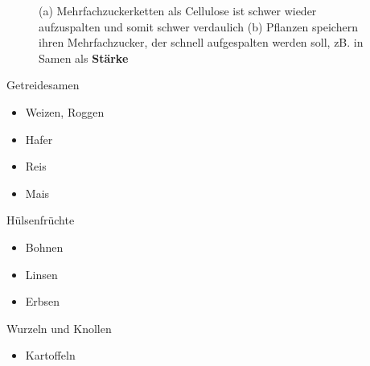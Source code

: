 \documentclass[xcolor=dvipsnames]{beamer}
\begin{document}
\begin{frame}[allowframebreaks]
        \begin{figure}
            \centering
            \caption{(a) Mehrfachzuckerketten als Cellulose ist schwer wieder aufzuspalten und somit schwer verdaulich
                     (b) Pflanzen speichern ihren Mehrfachzucker, der schnell aufgespalten werden soll, zB. in Samen als \textbf{Stärke}}
        \end{figure}

        \framebreak

        \begin{block}{Getreidesamen}
            \begin{itemize}
                \item Weizen, Roggen
                \item Hafer
                \item Reis
                \item Mais
            \end{itemize}
        \end{block}

        \begin{block}{Hülsenfrüchte}
            \begin{itemize}
                \item Bohnen
                \item Linsen
                \item Erbsen
            \end{itemize}
        \end{block}

        \begin{block}{Wurzeln und Knollen}
            \begin{itemize}
                \item Kartoffeln
            \end{itemize}
        \end{block}
    \end{frame}
\end{document}
